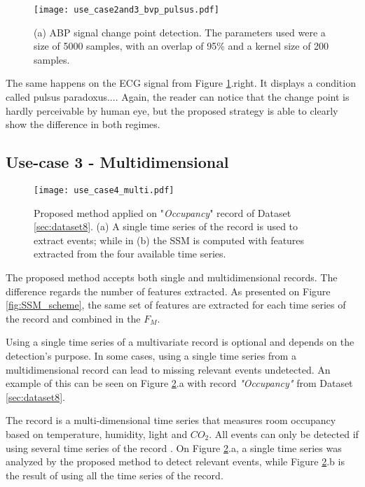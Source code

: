 {\begin{figure}
    \centering
    \texttt{[image: use\_case2and3\_bvp\_pulsus.pdf]}
    \caption{(a) ABP signal change point detection. The parameters used were a size of 5000 samples, with an overlap of 95\% and a kernel size of 200 samples.}
    \label{fig:example2_3}
\end{figure}

The same happens on the \gls{ECG} signal from Figure \ref{fig:example2_3}.right. It displays a condition called pulsus paradoxus.... Again, the reader can notice that the change point is hardly perceivable by human eye, but the proposed strategy is able to clearly show the difference in both regimes.

\subsection{Use-case 3 - Multidimensional}

\begin{figure}
    \centering
    \texttt{[image: use\_case4\_multi.pdf]}
    \caption{Proposed method applied on "\textit{Occupancy}" record of Dataset \ref{sec:dataset8}. (a) A single time series of the record is used to extract events; while in (b) the \gls{SSM} is computed with features extracted from the four available time series.}
    \label{fig:example4}
\end{figure}

The proposed method accepts both single and multidimensional records. The difference regards the number of features extracted. As presented on Figure \ref{fig:SSM_scheme}, the same set of features are extracted for each time series of the record and combined in the $F_M$. 
\par
Using a single time series of a multivariate record is optional and depends on the detection's purpose. In some cases, using a single time series from a multidimensional record can lead to missing relevant events undetected. An example of this can be seen on Figure \ref{fig:example4}.a with record \textit{"Occupancy"} from Dataset \ref{sec:dataset8}. 
\par
The record is a multi-dimensional time series that measures room occupancy based on temperature, humidity, light and $CO_2$. All events can only be detected if using several time series of the record \cite{cpd_alan}. On Figure \ref{fig:example4}.a, a single time series was analyzed by the proposed method to detect relevant events, while Figure \ref{fig:example4}.b is the result of using all the time series of the record.

}
